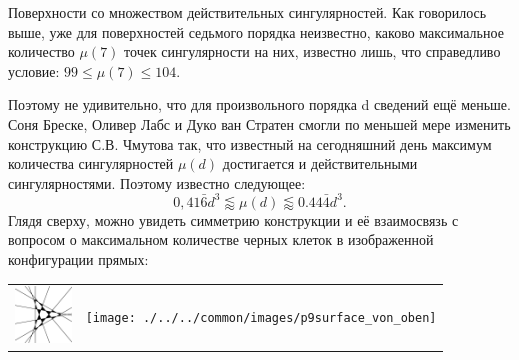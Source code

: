 \begin{surferPage}[216 Синг.]{Поверхности со множеством действительных сингулярностей.}
    Как говорилось выше, уже для поверхностей седьмого порядка неизвестно, каково максимальное количество $\mu(7)$ точек сингулярности на них, известно лишь, что справедливо условие: $99\le \mu(7) \le 104$. 

Поэтому не удивительно, что для произвольного порядка d сведений ещё меньше. Соня Бреске, Оливер Лабс и Дуко ван Стратен смогли по меньшей мере изменить конструкцию С.В. Чмутова так, что известный на сегодняшний день максимум количества сингулярностей $\mu(d)$ достигается и действительными сингулярностями. Поэтому известно следующее: 
    \[0,41\bar{6}d^3 \lessapprox \mu(d) \lessapprox 0.44\bar{4} d^3.\]
Глядя сверху, можно увидеть симметрию конструкции и её взаимосвязь с вопросом о максимальном количестве черных клеток в изображенной конфигурации прямых:
    \begin{center}
      \begin{tabular}{c@{\qquad}c}
        \includegraphics[height=1.5cm]{./../../common/images/vielesing.pdf}
        &
        \texttt{[image: ./../../common/images/p9surface\_von\_oben]}
      \end{tabular}
    \end{center}
\end{surferPage}
